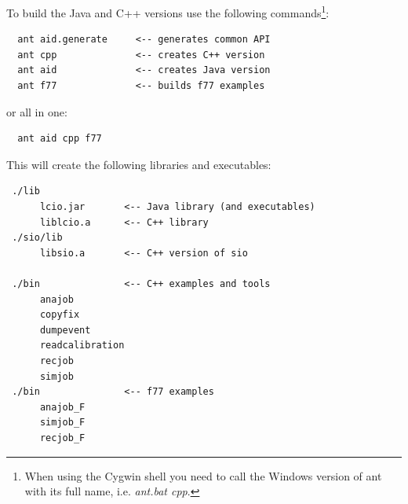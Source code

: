 \documentclass[twoside]{article}
\begin{document}





To build the Java and C++ versions use the following commands\footnote{When using the Cygwin shell you need to
call the Windows version of ant with its full name, i.e. {\em ant.bat cpp}.}:
\begin{verbatim}
  ant aid.generate     <-- generates common API
  ant cpp              <-- creates C++ version
  ant aid              <-- creates Java version
  ant f77              <-- builds f77 examples
\end{verbatim}
or all in one:
\begin{verbatim}
  ant aid cpp f77
\end{verbatim}

This will create the following libraries and executables:

\begin{verbatim}
 ./lib
      lcio.jar       <-- Java library (and executables)
      liblcio.a      <-- C++ library
 ./sio/lib
      libsio.a       <-- C++ version of sio 

 ./bin               <-- C++ examples and tools
      anajob
      copyfix
      dumpevent
      readcalibration
      recjob
      simjob
 ./bin               <-- f77 examples
      anajob_F
      simjob_F
      recjob_F 

\end{verbatim}
\end{document}
